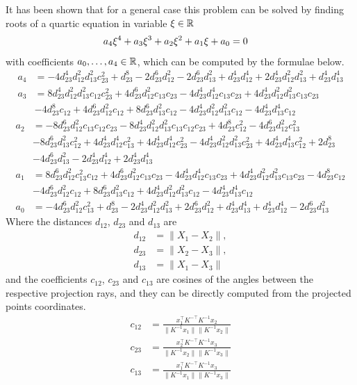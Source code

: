 It has been shown that for a general case this problem can be solved by finding roots of a quartic equation in variable $\xi\in\mathbb{R}$
\begin{align}
  a_4\xi^4 + a_3\xi^3 + a_2\xi^2 + a_1\xi + a_0 &= 0\labeleq{app:P3P:4}
\end{align}
with coefficients $a_0, \ldots, a_4\in\mathbb{R}$, which can be computed by the formulae below.
\begin{align}
  a_4 &= -4d_{23}^4d_{12}^2d_{13}^2c_{23}^2+d_{23}^8-2d_{23}^6d_{12}^2-2d_{23}^6d_{13}^2+d_{23}^4d_{12}^4+2d_{23}^4d_{12}^2d_{13}^2+d_{23}^4d_{13}^4\\
  a_3 &= 8d_{23}^4d_{12}^2d_{13}^2c_{12}c_{23}^2+4d_{23}^6d_{12}^2c_{13}c_{23}-4d_{23}^4d_{12}^4c_{13}c_{23}+4d_{23}^4d_{12}^2d_{13}^2c_{13}c_{23}\\
      &-4d_{23}^8c_{12}+4d_{23}^6d_{12}^2c_{12}+8d_{23}^6d_{13}^2c_{12}-4d_{23}^4d_{12}^2d_{13}^2c_{12}-4d_{23}^4d_{13}^4c_{12}\nonumber
\end{align}
\begin{align}
  a_2 &= -8d_{23}^6d_{12}^2c_{13}c_{12}c_{23}-8d_{23}^4d_{12}^2d_{13}^2c_{13}c_{12}c_{23}+4d_{23}^8c_{12}^2-4d_{23}^6d_{12}^2c_{13}^2\\
      &-8d_{23}^6d_{13}^2c_{12}^2+4d_{23}^4d_{12}^4c_{13}^2+4d_{23}^4d_{12}^4c_{23}^2-4d_{23}^4d_{12}^2d_{13}^2c_{23}^2+4d_{23}^4d_{13}^4c_{12}^2+2d_{23}^8\nonumber\\
      &-4d_{23}^6d_{13}^2-2d_{23}^4d_{12}^4+2d_{23}^4d_{13}^4\nonumber\\
  a_1 &= 8d_{23}^6d_{12}^2c_{13}^2c_{12}+4d_{23}^6d_{12}^2c_{13}c_{23}-4d_{23}^4d_{12}^4c_{13}c_{23}+4d_{23}^4d_{12}^2d_{13}^2c_{13}c_{23}-4d_{23}^8c_{12}\\
      &-4d_{23}^6d_{12}^2c_{12}+8d_{23}^6d_{13}^2c_{12}+4d_{23}^4d_{12}^2d_{13}^2c_{12}-4d_{23}^4d_{13}^4c_{12}\nonumber\\
  a_0 &= -4d_{23}^6d_{12}^2c_{13}^2+d_{23}^8-2d_{23}^4d_{12}^2d_{13}^2+2d_{23}^6d_{12}^2+d_{23}^4d_{13}^4+d_{23}^4d_{12}^4-2d_{23}^6d_{13}^2
\end{align}
Where the distances $d_{12}$, $d_{23}$ and $d_{13}$ are
\begin{align}
  d_{12} &= \|X_1 - X_2\|,\\
  d_{23} &= \|X_2 - X_3\|,\\
  d_{13} &= \|X_1 - X_3\|
\end{align}
and the coefficients $c_{12}$, $c_{23}$ and $c_{13}$ are cosines of the angles between the respective projection rays, and they can be directly computed from the projected points coordinates.
\begin{align}
  c_{12} &= \frac{x_1^\top K^{-\top} K^{-1}x_2}{\|K^{-1}x_1\|\|K^{-1}x_2\|}\\
  c_{23} &= \frac{x_2^\top K^{-\top} K^{-1}x_3}{\|K^{-1}x_2\|\|K^{-1}x_3\|}\\
  c_{13} &= \frac{x_1^\top K^{-\top} K^{-1}x_3}{\|K^{-1}x_1\|\|K^{-1}x_3\|}
\end{align}

